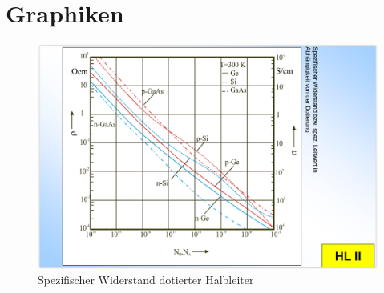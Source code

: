\documentclass[12pt,a4paper]{report}%
\numberwithin{equation}{section}
\numberwithin{equation}{subsection}
\begin{document}
\section{Graphiken}
  \begin{figure}[H]
		  \centering
		  \captionsetup{justification=centering}
		  \includegraphics[width=1\linewidth]{dotierteHalbleiter_spezWid.png}
		  \caption{Spezifischer Widerstand dotierter Halbleiter}
		  \label{fig:dotierteHalbleiter_spezWid}
		\end{figure}



\end{document}
